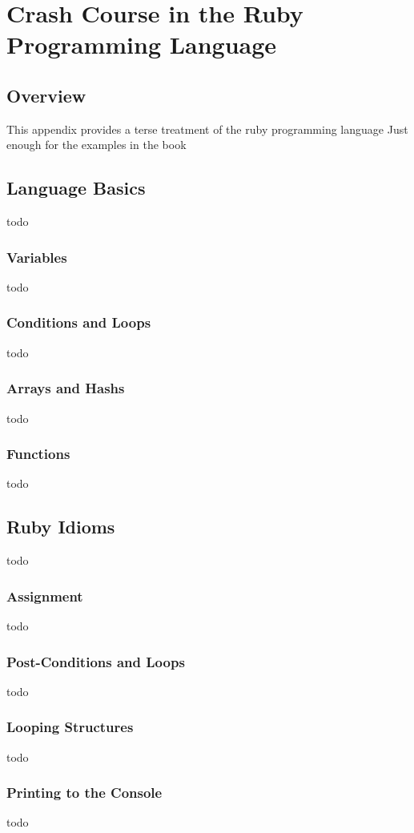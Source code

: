 

\chapter{Crash Course in the Ruby Programming Language}
\label{ch:appendix1}

\section*{Overview}
This appendix provides a terse treatment of the ruby programming language
Just enough for the examples in the book

\section*{Language Basics}
todo

\subsection{Variables}
todo

\subsection{Conditions and Loops}
todo

\subsection{Arrays and Hashs}
todo

\subsection{Functions}
todo

\section*{Ruby Idioms}
todo

\subsection{Assignment}
todo

\subsection{Post-Conditions and Loops}
todo

\subsection{Looping Structures}
todo

\subsection{Printing to the Console}
todo


